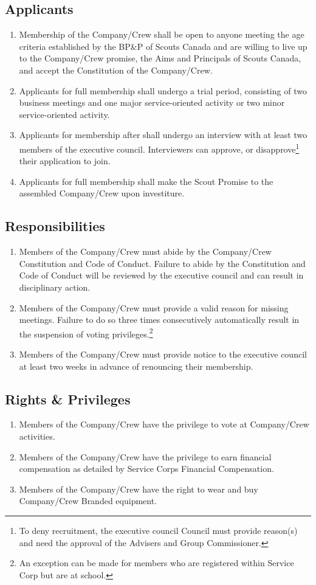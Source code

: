 \subsection{Applicants}
\begin{enumerate}
	\item Membership of the Company/Crew shall be open to anyone meeting the age criteria established by the BP\&P of Scouts Canada and are willing to live up to the Company/Crew promise, the Aims and Principals of Scouts Canada, and accept the Constitution of the Company/Crew. 
	\item Applicants for full membership shall undergo a trial period, consisting of two business meetings and one major service-oriented activity or two minor service-oriented activity.
	\item Applicants for membership after shall undergo an interview with at least two members of the executive council.
	Interviewers can approve, or disapprove\footnote{To deny recruitment, the executive council Council must provide reason(s) and need the approval of the Advisers and Group Commissioner.} their application to join.
	\item Applicants for full membership shall make the Scout Promise to the assembled Company/Crew upon investiture. 
\end{enumerate}
\subsection{Responsibilities}
\begin{enumerate}
	\item Members of the Company/Crew must abide by the Company/Crew Constitution and Code of Conduct.
	Failure to abide by the Constitution and Code of Conduct will be reviewed by the executive council and can result in disciplinary action.
	\item Members of the Company/Crew must provide a valid reason for missing meetings.
	Failure to do so three times consecutively automatically result in the suspension of voting privileges.\footnote{An exception can be made for members who are registered within Service Corp but are at school.}
	\item Members of the Company/Crew must provide notice to the executive council at least two weeks in advance of renouncing their membership.
\end{enumerate}
\subsection{Rights \& Privileges}
\begin{enumerate}
	\item Members of the Company/Crew have the privilege to vote at Company/Crew activities.
	\item Members of the Company/Crew have the privilege to earn financial compensation as detailed by Service Corps Financial Compensation.
	\item Members of the Company/Crew have the right to wear and buy Company/Crew Branded equipment.
\end{enumerate}